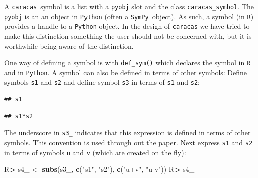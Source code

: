 \documentclass[10pt,]{article}
\newenvironment{Shaded}{\begin{snugshade}}{\end{snugshade}}
\newcommand{\CommentTok}[1]{\textcolor[rgb]{0.56,0.35,0.01}{\textit{#1}}}
\newcommand{\KeywordTok}[1]{\textcolor[rgb]{0.13,0.29,0.53}{\textbf{#1}}}
\newcommand{\NormalTok}[1]{#1}
\newcommand{\OperatorTok}[1]{\textcolor[rgb]{0.81,0.36,0.00}{\textbf{#1}}}
\newcommand{\StringTok}[1]{\textcolor[rgb]{0.31,0.60,0.02}{#1}}
\begin{document}
A \texttt{caracas}~symbol is a list with a \texttt{pyobj} slot and the
class \texttt{caracas\_symbol}. The \texttt{pyobj} is an an object in
\texttt{Python} (often a \texttt{SymPy}~object). As such, a symbol (in
\texttt{R}) provides a handle to a \texttt{Python} object. In the design
of \texttt{caracas} we have tried to make this distinction something the
user should not be concerned with, but it is worthwhile being aware of
the distinction.

One way of defining a symbol is with \texttt{def\_sym()} which declares
the symbol in \texttt{R} and in \texttt{Python}. A symbol can also be
defined in terms of other symbols: Define symbols \texttt{s1} and
\texttt{s2} and define symbol \texttt{s3} in terms of \texttt{s1} and
\texttt{s2}:

\begin{Shaded}
\end{Shaded}

\begin{verbatim}
## s1
\end{verbatim}

\begin{Shaded}
\end{Shaded}

\begin{verbatim}
## s1*s2
\end{verbatim}

The underscore in \texttt{s3\_} indicates that this expression is
defined in terms of other symbols. This convention is used through out
the paper. Next express \texttt{s1} and \texttt{s2} in terms of symbols
\texttt{u} and \texttt{v} (which are created on the fly):

\begin{Shaded}
\begin{Highlighting}[]
\NormalTok{R}\OperatorTok{>}\StringTok{ }\NormalTok{s4_ <-}\StringTok{ }\KeywordTok{subs}\NormalTok{(s3_, }\KeywordTok{c}\NormalTok{(}\StringTok{"s1"}\NormalTok{, }\StringTok{"s2"}\NormalTok{), }\KeywordTok{c}\NormalTok{(}\StringTok{"u+v"}\NormalTok{, }\StringTok{"u-v"}\NormalTok{))}
\NormalTok{R}\OperatorTok{>}\StringTok{ }\NormalTok{s4_}
\end{Highlighting}
\end{Shaded}
\end{document}
